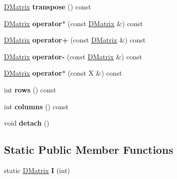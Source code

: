 \begin{DoxyCompactItemize}
\hyperlink{classGMapping_1_1DMatrix}{D\+Matrix} {\bfseries transpose} () const
\item 
\mbox{\label{classGMapping_1_1DMatrix_a79a10f3e814048d1af87ae437fcf1145}} 
\hyperlink{classGMapping_1_1DMatrix}{D\+Matrix} {\bfseries operator$\ast$} (const \hyperlink{classGMapping_1_1DMatrix}{D\+Matrix} \&) const
\item 
\mbox{\label{classGMapping_1_1DMatrix_aa45eff3d6e74cd3ed9f1d56d7f240e6d}} 
\hyperlink{classGMapping_1_1DMatrix}{D\+Matrix} {\bfseries operator+} (const \hyperlink{classGMapping_1_1DMatrix}{D\+Matrix} \&) const
\item 
\mbox{\label{classGMapping_1_1DMatrix_aeea90704fe42b34a766ee290f89f16eb}} 
\hyperlink{classGMapping_1_1DMatrix}{D\+Matrix} {\bfseries operator-\/} (const \hyperlink{classGMapping_1_1DMatrix}{D\+Matrix} \&) const
\item 
\mbox{\label{classGMapping_1_1DMatrix_abe8c4f0d60a1945e345e2863bf794dc5}} 
\hyperlink{classGMapping_1_1DMatrix}{D\+Matrix} {\bfseries operator$\ast$} (const X \&) const
\item 
\mbox{\label{classGMapping_1_1DMatrix_ad42ec3c0d6daa6364fb4092a8b946835}} 
int {\bfseries rows} () const
\item 
\mbox{\label{classGMapping_1_1DMatrix_a6aea53c527dc5ac2a740a391f37b9e97}} 
int {\bfseries columns} () const
\item 
\mbox{\label{classGMapping_1_1DMatrix_abcdadf2eaabdc3c894499aa1726a70b0}} 
void {\bfseries detach} ()
\end{DoxyCompactItemize}
\subsection*{Static Public Member Functions}
\begin{DoxyCompactItemize}
\item 
\mbox{\label{classGMapping_1_1DMatrix_a962a31232ee9329b7bb92db1d4826095}} 
static \hyperlink{classGMapping_1_1DMatrix}{D\+Matrix} {\bfseries I} (int)
\end{DoxyCompactItemize}
